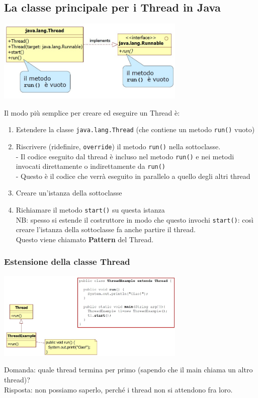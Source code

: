 \subsection{La classe principale per i Thread in Java}
\begin{center}
    \includegraphics[width=0.675\textwidth]{img/thread1.jpg}
\end{center}
Il modo più semplice per creare ed eseguire un Thread è:
\begin{enumerate}
    \item Estendere la classe \verb#java.lang.Thread# (che contiene un metodo \verb#run()# vuoto)
    \item Riscrivere (ridefinire, \verb#override#) il metodo \verb#run()# nella sottoclasse.
    \\- Il codice eseguito dal thread è incluso nel metodo \verb#run()# e nei metodi invocati direttamente o indirettamente da \verb#run()#
    \\- Questo è il codice che verrà eseguito in parallelo a quello degli altri thread
    \item Creare un'istanza della sottoclasse
    \item Richiamare il metodo \verb#start()# su questa istanza
    \\NB: spesso si estende il costruttore in modo che questo invochi \verb#start()#: così creare l'istanza della sottoclasse fa anche partire il thread.
    \\Questo viene chiamato \textbf{Pattern} del Thread.
\end{enumerate}

\subsubsection{Estensione della classe Thread}
\begin{center}
    \includegraphics[width=0.675\textwidth]{img/thread2.jpg}
\end{center}
Domanda: quale thread termina per primo (sapendo che il main chiama un altro thread)?
\\Risposta: non possiamo saperlo, perché i thread non si attendono fra loro.

